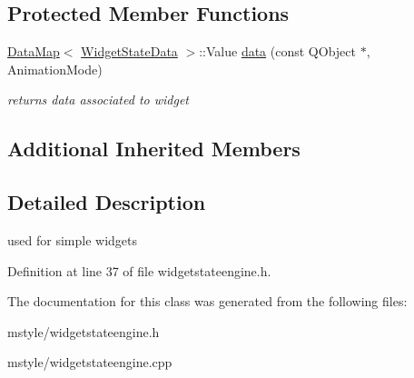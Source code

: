 \subsection*{Protected Member Functions}
\begin{DoxyCompactItemize}
\item 
\mbox{\label{class_widget_state_engine_aabb2c354075ec7967ef8bb7aa760af25}} 
\hyperlink{class_data_map}{Data\+Map}$<$ \hyperlink{class_widget_state_data}{Widget\+State\+Data} $>$\+::Value \hyperlink{class_widget_state_engine_aabb2c354075ec7967ef8bb7aa760af25}{data} (const Q\+Object $\ast$, Animation\+Mode)
\begin{DoxyCompactList}\small\item\em returns data associated to widget \end{DoxyCompactList}\end{DoxyCompactItemize}
\subsection*{Additional Inherited Members}


\subsection{Detailed Description}
used for simple widgets 

Definition at line 37 of file widgetstateengine.\+h.



The documentation for this class was generated from the following files\+:\begin{DoxyCompactItemize}
\item 
mstyle/widgetstateengine.\+h\item 
mstyle/widgetstateengine.\+cpp\end{DoxyCompactItemize}
